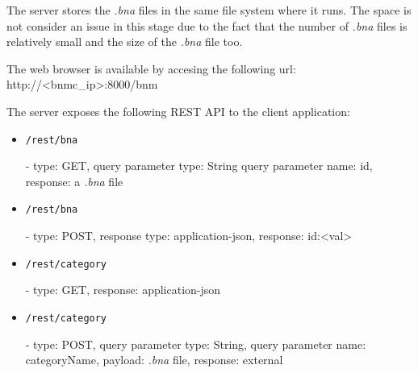 The server stores the \emph{.bna} files in the same file system where it runs. The space is not consider an issue in this stage due to the fact that the number of \emph{.bna} files is relatively small and the size of the \emph{.bna} file too.

The web browser is available by accesing the following url: http://<bnmc_ip>:8000/bnm

The server exposes the following REST API to the client application:
\begin{itemize}
	\item \begin{verbatim}/rest/bna\end{verbatim} - type: GET, query parameter type: String query parameter name: id, response: a \emph{.bna} file
	\item \begin{verbatim}/rest/bna\end{verbatim} - type: POST, response type: application-json, response: {id:<val>}
	\item \begin{verbatim}/rest/category\end{verbatim} - type: GET, response: application-json
	\item \begin{verbatim}/rest/category\end{verbatim} - type: POST, query parameter type: String, query parameter name: categoryName, payload: \emph{.bna} file, response: external
\end{itemize}


